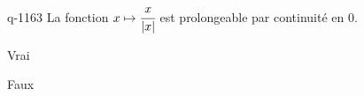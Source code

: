\begin{truefalse}{q-1163}
La fonction $x\mapsto \cfrac{x}{|x|}$ est prolongeable par continuité en $0$.
\item Vrai
\item* Faux
\end{truefalse}

